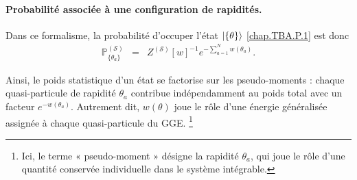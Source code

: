 \paragraph{Probabilité associée à une configuration de rapidités.}
Dans ce formalisme, la probabilité d’occuper l’état $\ket{\{\theta \}}$ \eqref{chap.TBA.P.1} est donc
\begin{eqnarray}
	\mathbb{P}^{(\mathcal{S})}_{\{ \theta_a \}} & = &  Z^{(\mathcal{S})}[w]^{-1}e^{-\sum_{a = 1}^N w(\theta_a)}\label{chap.TBA.P.w.2}. 		
\end{eqnarray}

Ainsi, le poids statistique d’un état se factorise sur les pseudo-moments : chaque quasi-particule de rapidité \(\theta_a\) contribue indépendamment au poids total avec un facteur \(e^{-w(\theta_a)}\). Autrement dit, \(w(\theta)\) joue le rôle d’une énergie généralisée assignée à chaque quasi-particule du \gls{GGE}.
\footnote{Ici, le terme « pseudo-moment » désigne la rapidité \(\theta_a\), qui joue le rôle d’une quantité conservée individuelle dans le système intégrable.}





